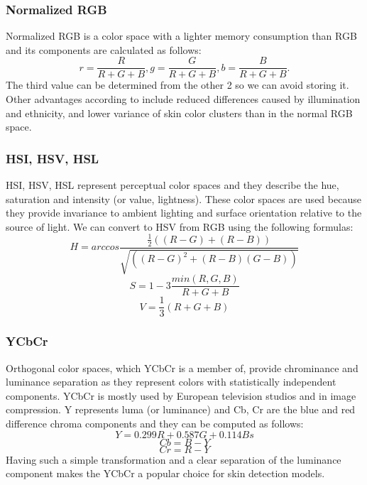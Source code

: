 \documentclass[12pt]{report}
\begin{document}
	\subsubsection{Normalized RGB}
	Normalized RGB is a color space with a lighter memory consumption than RGB and its components are calculated as follows\cite{survey_color_detection_techniques}: 
	\begin{equation}
	r = \frac{R}{R + G + B}, g = \frac{G}{R + G + B}, b = \frac{B}{R + G + B}.
	\end{equation}
	The third value can be determined from the other 2 so we can avoid storing it. Other advantages according to \cite{survey_skin_color_modeling} include reduced differences caused by illumination and ethnicity, and lower variance of skin color clusters than in the normal RGB space.
	
	\subsubsection{HSI, HSV, HSL}
	HSI, HSV, HSL represent perceptual color spaces and they describe the hue, saturation and intensity (or value, lightness). These color spaces are used because they provide invariance to ambient lighting and surface orientation relative to the source of light\cite{survey_skin_color_modeling}. We can convert to HSV from RGB using the following formulas\cite{survey_color_detection_techniques}:
	\begin{equation}
	H = arccos\frac{\frac{1}{2}((R - G) + (R - B))}{\sqrt{((R - G)^2 + (R - B)(G - B))}}
	\end{equation}
	\begin{equation}
	S = 1 - 3 \frac{min(R, G, B)}{R + G + B}
	\end{equation}
	\begin{equation}
	V = \frac{1}{3}(R + G + B)
	\end{equation}

	\subsubsection{YCbCr}
	Orthogonal color spaces, which YCbCr is a member of, provide chrominance and luminance separation as they represent colors with statistically independent components. YCbCr is mostly used by European television studios and in image compression\cite{survey_color_detection_techniques}. Y represents luma (or luminance) and Cb, Cr are the blue and red difference chroma components and they can be computed as follows:
	\begin{equation}
	Y = 0.299R + 0.587G + 0.114Bs
	\end{equation}
	\begin{equation}
	Cb = B - Y
	\end{equation}
	\begin{equation}
	Cr = R - Y
	\end{equation}
	Having such a simple transformation and a clear separation of the luminance component makes the YCbCr a popular choice for skin detection models.
	
\end{document}

